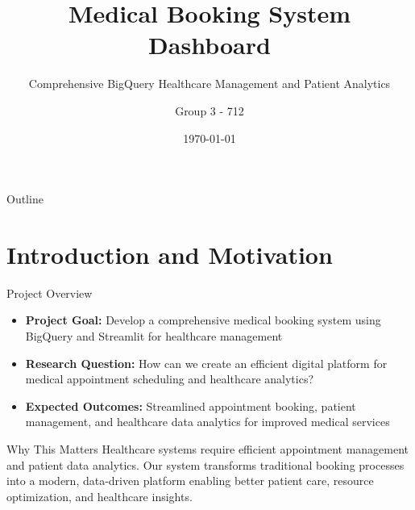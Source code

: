\documentclass[aspectratio=169]{beamer}
\title{Medical Booking System Dashboard}
\subtitle{Comprehensive BigQuery Healthcare Management and Patient Analytics}
\author{Group 3 - 712}
\institute{Assignment 2}
\date{\today}
\begin{document}
\begin{frame}
\titlepage
\end{frame}

\begin{frame}{Outline}
\tableofcontents
\end{frame}

\section{Introduction and Motivation}

\begin{frame}{Project Overview}
\begin{itemize}
    \item \textbf{Project Goal:} Develop a comprehensive medical booking system using BigQuery and Streamlit for healthcare management
    \item \textbf{Research Question:} How can we create an efficient digital platform for medical appointment scheduling and healthcare analytics?
    \item \textbf{Expected Outcomes:} Streamlined appointment booking, patient management, and healthcare data analytics for improved medical services
\end{itemize}

\vspace{1cm}

\begin{block}{Why This Matters}
Healthcare systems require efficient appointment management and patient data analytics. Our system transforms traditional booking processes into a modern, data-driven platform enabling better patient care, resource optimization, and healthcare insights.
\end{block}
\end{frame}
\end{document}
